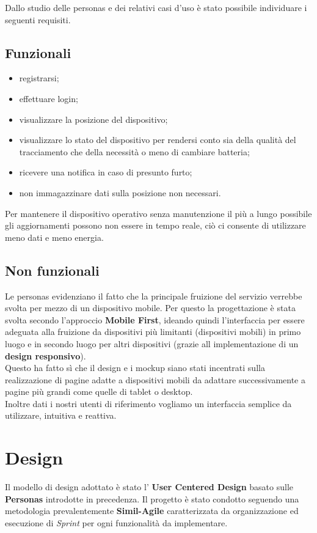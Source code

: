 \documentclass{report}
\begin{document}
Dallo studio delle personas e dei relativi casi d'uso è stato possibile individuare i seguenti requisiti.


\subsection{Funzionali}
\begin{itemize}
    \item registrarsi;
    \item effettuare login;
    \item visualizzare la posizione del dispositivo;
    \item visualizzare lo stato del dispositivo per rendersi conto sia della qualità del tracciamento che della necessità o meno di cambiare batteria;
    \item ricevere una notifica in caso di presunto furto;
    \item non immagazzinare dati sulla posizione non necessari.
\end{itemize}

Per mantenere il dispositivo operativo senza manutenzione il più a lungo possibile gli aggiornamenti possono non essere in tempo reale, ciò ci consente di utilizzare meno dati e meno energia.
\subsection{Non funzionali}
Le personas evidenziano il fatto che la principale fruizione del servizio verrebbe svolta per mezzo di un dispositivo mobile. Per questo la progettazione è stata svolta secondo l'approccio \textbf{Mobile First}, ideando quindi l'interfaccia per essere adeguata alla fruizione da dispositivi più limitanti (dispositivi mobili) in primo luogo e in secondo luogo per altri dispositivi (grazie all implementazione di un \textbf{design responsivo}). \\
Questo ha fatto sì che il design e i mockup siano stati incentrati sulla realizzazione di pagine adatte a dispositivi mobili da adattare successivamente a pagine più grandi come quelle di tablet o desktop.\\
Inoltre dati i nostri utenti di riferimento vogliamo un interfaccia semplice da utilizzare, intuitiva e reattiva.
\section{Design}
Il modello di design adottato è stato l' \textbf{User Centered Design} basato sulle \textbf{Personas} introdotte in precedenza. Il progetto è stato condotto seguendo una metodologia prevalentemente \textbf{Simil-Agile} caratterizzata da organizzazione ed esecuzione di \textit{Sprint} per ogni funzionalità da implementare.\\
\end{document}
